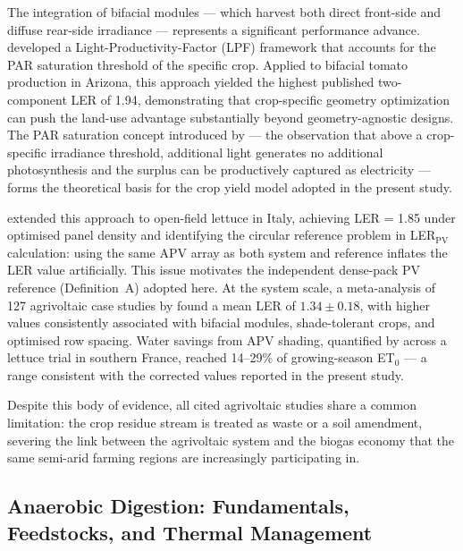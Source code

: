 The integration of bifacial modules --- which harvest both direct
front-side and diffuse rear-side irradiance --- represents a significant
performance advance. \citet{riaz2022} developed a Light-Productivity-Factor
(LPF) framework that accounts for the PAR saturation threshold of the
specific crop. Applied to bifacial tomato production in Arizona, this
approach yielded the highest published two-component LER of 1.94,
demonstrating that crop-specific geometry optimization can push the
land-use advantage substantially beyond geometry-agnostic designs. The
PAR saturation concept introduced by \citet{riaz2022} --- the observation
that above a crop-specific irradiance threshold, additional light generates
no additional photosynthesis and the surplus can be productively captured
as electricity --- forms the theoretical basis for the crop yield model
adopted in the present study.

\citet{mazzeo2025} extended this approach to open-field lettuce in Italy,
achieving LER = 1.85 under optimised panel density and identifying the
circular reference problem in LER$_{\text{PV}}$ calculation: using the
same APV array as both system and reference inflates the LER value
artificially. This issue motivates the independent dense-pack PV reference
(Definition~A) adopted here. At the system scale, a meta-analysis of 127
agrivoltaic case studies by \citet{semeraro2024} found a mean LER of
$1.34 \pm 0.18$, with higher values consistently associated with bifacial
modules, shade-tolerant crops, and optimised row spacing. Water savings
from APV shading, quantified by \citet{elamri2018} across a lettuce trial
in southern France, reached 14--29\% of growing-season ET$_0$ --- a range
consistent with the corrected values reported in the present study.

Despite this body of evidence, all cited agrivoltaic studies share a common
limitation: the crop residue stream is treated as waste or a soil amendment,
severing the link between the agrivoltaic system and the biogas economy that
the same semi-arid farming regions are increasingly participating in.

\subsection{Anaerobic Digestion: Fundamentals, Feedstocks, and
Thermal Management}
 

